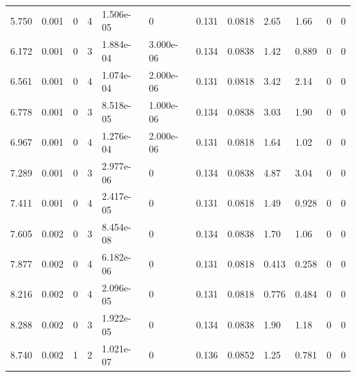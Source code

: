 \documentclass[preview]{standalone}
\begin{document}
{{\begin{tabular}{L{1.2cm}C{1.2cm} C{0.3cm}C{0.5cm} C{1.4cm}C{1.4cm} C{1.4cm}C{1.4cm} C{1.6cm}C{1.6cm} C{1.6cm}C{1.6cm}}
  5.750  &  0.001  & 0     &  4 &  1.506e-05  & 0  &  0.131&   0.0818& 2.65 & 1.66   &  0 & 0  \\ 
  6.172  &  0.001  & 0     &  3 &  1.884e-04  & 3.000e-06  &  0.134&   0.0838& 1.42 & 0.889   &  0 & 0  \\ 
  6.561  &  0.001  & 0     &  4 &  1.074e-04  & 2.000e-06  &  0.131&   0.0818& 3.42 & 2.14   &  0 & 0  \\ 
  6.778  &  0.001  & 0     &  3 &  8.518e-05  & 1.000e-06  &  0.134&   0.0838& 3.03 & 1.90   &  0 & 0  \\ 
  6.967  &  0.001  & 0     &  4 &  1.276e-04  & 2.000e-06  &  0.131&   0.0818& 1.64 & 1.02   &  0 & 0  \\ 
  7.289  &  0.001  & 0     &  3 &  2.977e-06  & 0  &  0.134&   0.0838& 4.87 & 3.04   &  0 & 0  \\ 
  7.411  &  0.001  & 0     &  4 &  2.417e-05  & 0  &  0.131&   0.0818& 1.49 & 0.928   &  0 & 0  \\ 
  7.605  &  0.002  & 0     &  3 &  8.454e-08  & 0  &  0.134&   0.0838& 1.70 & 1.06   &  0 & 0  \\ 
  7.877  &  0.002  & 0     &  4 &  6.182e-06  & 0  &  0.131&   0.0818& 0.413 & 0.258   &  0 & 0  \\ 
  8.216  &  0.002  & 0     &  4 &  2.096e-05  & 0  &  0.131&   0.0818& 0.776 & 0.484   &  0 & 0  \\ 
  8.288  &  0.002  & 0     &  3 &  1.922e-05  & 0  &  0.134&   0.0838& 1.90 & 1.18   &  0 & 0  \\ 
  8.740  &  0.002  & 1     &  2 &  1.021e-07  & 0  &  0.136&   0.0852& 1.25 & 0.781   &  0 & 0  \\ 
\hline 
\end{tabular} 

}}
\end{document}
